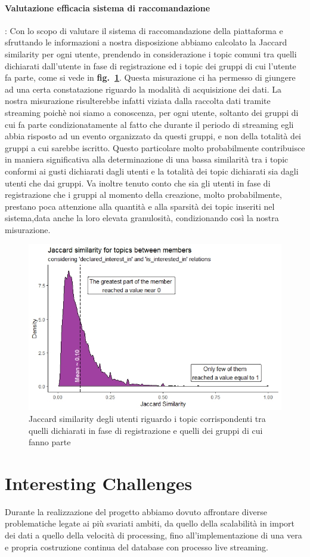 \documentclass[fleqn,10pt]{SelfArx} %
\begin{document}
{\paragraph{Valutazione efficacia sistema di raccomandazione}:
Con lo scopo di valutare il sistema di raccomandazione della piattaforma e sfruttando le informazioni a nostra disposizione abbiamo calcolato la Jaccard similarity per ogni utente, prendendo in considerazione i topic comuni tra quelli dichiarati dall'utente in fase di registrazione ed i topic dei gruppi di cui l'utente fa parte, come si vede in \textbf{fig.~\ref{jaccard_similarity}}. 
Questa misurazione ci ha permesso di giungere ad una certa constatazione riguardo la modalità di acquisizione dei dati. 
La nostra misurazione risulterebbe infatti viziata dalla raccolta dati tramite streaming poichè noi siamo a conoscenza, per ogni utente, soltanto dei gruppi di cui fa parte condizionatamente al fatto che durante il periodo di streaming egli abbia risposto ad un evento organizzato da questi gruppi, e non della totalità dei gruppi a cui sarebbe iscritto. 
Questo particolare molto probabilmente contribuisce in maniera significativa alla determinazione di una bassa similarità tra i topic conformi ai gusti dichiarati dagli utenti e la totalità dei topic dichiarati sia dagli utenti che dai gruppi. 
Va inoltre tenuto conto che sia gli utenti in fase di registrazione che i gruppi al momento della creazione, molto probabilmente, prestano poca attenzione alla quantità e alla sparsità dei topic inseriti nel sistema,data anche la loro elevata granulosità, condizionando così la nostra misurazione. 
\begin{figure}
\centering
\includegraphics[width = 8.7 cm, height = 5 cm]{jaccard_similarity.jpeg}
\caption{\label{jaccard_similarity} Jaccard similarity degli utenti riguardo i topic corrispondenti tra quelli dichiarati in fase di registrazione e quelli dei gruppi di cui fanno parte}
\end{figure}
\section{Interesting Challenges}
{\small
Durante la realizzazione del progetto abbiamo dovuto affrontare diverse problematiche legate ai più svariati ambiti, da quello della scalabilità in import dei dati a quello della velocità di processing, fino all'implementazione di una vera e propria costruzione continua del database con processo live streaming.
}}
\end{document}
